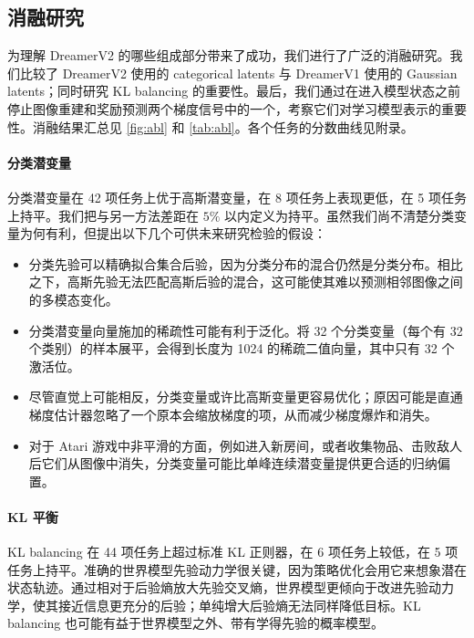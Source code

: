 

\raggedbottom\pagebreak %

\subsection{消融研究}



为理解 DreamerV2 的哪些组成部分带来了成功，我们进行了广泛的消融研究。我们比较了 DreamerV2 使用的 categorical latents 与 DreamerV1 使用的 Gaussian latents；同时研究 KL balancing 的重要性。最后，我们通过在进入模型状态之前停止图像重建和奖励预测两个梯度信号中的一个，考察它们对学习模型表示的重要性。消融结果汇总见 \cref{fig:abl} 和 \cref{tab:abl}。各个任务的分数曲线见附录。

\paragraph{分类潜变量}

分类潜变量在 42 项任务上优于高斯潜变量，在 8 项任务上表现更低，在 5 项任务上持平。我们把与另一方法差距在 $5\%$ 以内定义为持平。虽然我们尚不清楚分类变量为何有利，但提出以下几个可供未来研究检验的假设：
\begin{itemize}
\item 分类先验可以精确拟合集合后验，因为分类分布的混合仍然是分类分布。相比之下，高斯先验无法匹配高斯后验的混合，这可能使其难以预测相邻图像之间的多模态变化。
\item 分类潜变量向量施加的稀疏性可能有利于泛化。将 32 个分类变量（每个有 32 个类别）的样本展平，会得到长度为 1024 的稀疏二值向量，其中只有 32 个激活位。
\item 尽管直觉上可能相反，分类变量或许比高斯变量更容易优化；原因可能是直通梯度估计器忽略了一个原本会缩放梯度的项，从而减少梯度爆炸和消失。
\item 对于 Atari 游戏中非平滑的方面，例如进入新房间，或者收集物品、击败敌人后它们从图像中消失，分类变量可能比单峰连续潜变量提供更合适的归纳偏置。
\end{itemize}

\paragraph{KL 平衡}

KL balancing 在 44 项任务上超过标准 KL 正则器，在 6 项任务上较低，在 5 项任务上持平。准确的世界模型先验动力学很关键，因为策略优化会用它来想象潜在状态轨迹。通过相对于后验熵放大先验交叉熵，世界模型更倾向于改进先验动力学，使其接近信息更充分的后验；单纯增大后验熵无法同样降低目标。KL balancing 也可能有益于世界模型之外、带有学得先验的概率模型。

